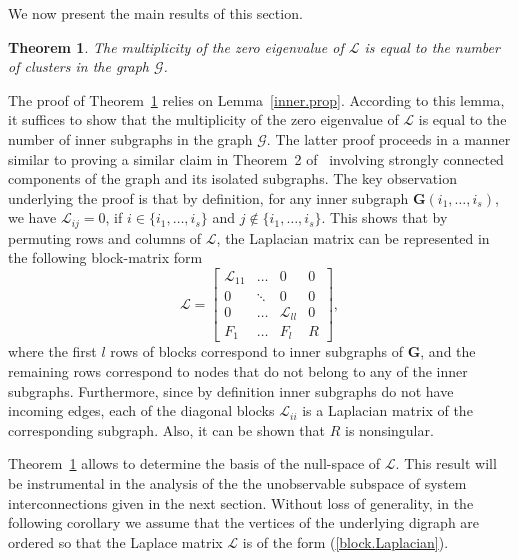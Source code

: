 \documentclass[a4paper,10pt,conference]{ieeeconf}
\newtheorem{theorem}{Theorem}
\begin{document}
We now present the main results of this section.  

\begin{theorem}\label{T1}
The multiplicity of the zero eigenvalue of $\mathcal{L}$ is equal to the
number of clusters in the graph $\mathcal{G}$. 
\end{theorem}

The proof of Theorem~\ref{T1} 
relies on  Lemma~\ref{inner.prop}. According to this lemma, it suffices to
show that the 
multiplicity of the zero eigenvalue of $\mathcal{L}$ is equal to the 
number of  inner subgraphs in the graph $\mathcal{G}$. The latter proof
proceeds in a manner similar to proving a similar claim in Theorem~2
of~\cite{FFS-2010} involving strongly connected components of the graph and
its isolated subgraphs. The key observation underlying the proof is that 
by definition, for any  inner
subgraph $\mathbf{G}(i_1,\ldots,i_s)$, we have $\mathcal{L}_{ij}=0$, if
$i \in\{i_1,\ldots,i_s\}$ and $j\not \in\{i_1,\ldots,i_s\}$.   
This shows that by permuting rows and
columns of $\mathcal{L}$, the Laplacian matrix can be represented in the
following block-matrix form  
\begin{equation}
  \label{block.Laplacian}
  \mathcal{L}=\left[
    \begin{array}{cccc}
      \mathcal{L}_{11} & \ldots & 0 & 0 \\
       0 & \ddots & 0 & 0 \\
       0 & \ldots & \mathcal{L}_{ll} & 0 \\
       F_1 & \ldots & F_l & R 
    \end{array}
\right],
\end{equation}
where the first $l$ rows of blocks correspond to  inner subgraphs
of $\mathbf{G}$, and the remaining rows correspond to nodes that do not
belong to any of the  inner subgraphs. Furthermore, since by
definition  inner subgraphs do not have incoming edges, each of the
diagonal blocks $\mathcal{L}_{ii}$ is a Laplacian matrix of the
corresponding subgraph. Also, it can be shown that $R$ is nonsingular.

Theorem~\ref{T1} allows to determine the basis of the null-space of
$\mathcal{L}$. This result will be instrumental in the analysis of the
the unobservable subspace of system interconnections given in the next
section. Without loss of generality, in the following corollary we assume
that the vertices of the underlying digraph are ordered so that the Laplace
matrix $\mathcal{L}$ is of the form (\ref{block.Laplacian}). 
\end{document}
